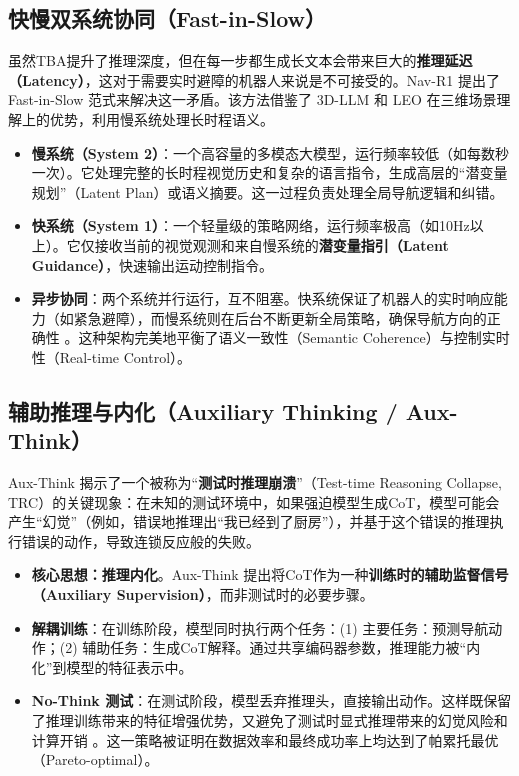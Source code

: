 \subsection{快慢双系统协同（Fast-in-Slow）}
虽然TBA提升了推理深度，但在每一步都生成长文本会带来巨大的\textbf{推理延迟（Latency）}，这对于需要实时避障的机器人来说是不可接受的。Nav-R1   提出了 Fast-in-Slow 范式来解决这一矛盾。该方法借鉴了 3D-LLM \cite{hong20233dllm} 和 LEO \cite{huang2024leo} 在三维场景理解上的优势，利用慢系统处理长时程语义。
\begin{itemize}
    \item \textbf{慢系统（System 2）}：一个高容量的多模态大模型，运行频率较低（如每数秒一次）。它处理完整的长时程视觉历史和复杂的语言指令，生成高层的“潜变量规划”（Latent Plan）或语义摘要。这一过程负责处理全局导航逻辑和纠错。
    \item \textbf{快系统（System 1）}：一个轻量级的策略网络，运行频率极高（如10Hz以上）。它仅接收当前的视觉观测和来自慢系统的\textbf{潜变量指引（Latent Guidance）}，快速输出运动控制指令。
    \item \textbf{异步协同}：两个系统并行运行，互不阻塞。快系统保证了机器人的实时响应能力（如紧急避障），而慢系统则在后台不断更新全局策略，确保导航方向的正确性  。这种架构完美地平衡了语义一致性（Semantic Coherence）与控制实时性（Real-time Control）。
\end{itemize}

\subsection{辅助推理与内化（Auxiliary Thinking / Aux-Think）}
Aux-Think   揭示了一个被称为“\textbf{测试时推理崩溃}”（Test-time Reasoning Collapse, TRC）的关键现象：在未知的测试环境中，如果强迫模型生成CoT，模型可能会产生“幻觉”（例如，错误地推理出“我已经到了厨房”），并基于这个错误的推理执行错误的动作，导致连锁反应般的失败。
\begin{itemize}
    \item \textbf{核心思想：推理内化}。Aux-Think 提出将CoT作为一种\textbf{训练时的辅助监督信号（Auxiliary Supervision）}，而非测试时的必要步骤。
    \item \textbf{解耦训练}：在训练阶段，模型同时执行两个任务：(1) 主要任务：预测导航动作；(2) 辅助任务：生成CoT解释。通过共享编码器参数，推理能力被“内化”到模型的特征表示中。
    \item \textbf{No-Think 测试}：在测试阶段，模型丢弃推理头，直接输出动作。这样既保留了推理训练带来的特征增强优势，又避免了测试时显式推理带来的幻觉风险和计算开销  。这一策略被证明在数据效率和最终成功率上均达到了帕累托最优（Pareto-optimal）。
\end{itemize}

